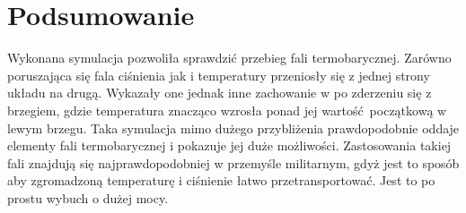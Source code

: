 \documentclass[a4paper, 12pt]{article}
\begin{document}
	\section*{Podsumowanie}
	
	Wykonana symulacja pozwoliła sprawdzić przebieg fali termobarycznej. 
	Zarówno poruszająca się fala ciśnienia jak i temperatury przeniosły się z jednej strony układu na drugą. 
	Wykazały one jednak inne zachowanie w po zderzeniu się z brzegiem, gdzie temperatura znacząco wzrosła ponad jej wartość początkową w lewym brzegu.
	Taka symulacja mimo dużego przybliżenia prawdopodobnie oddaje elementy fali termobarycznej i pokazuje jej duże możliwości.
	Zastosowania takiej fali znajdują się najprawdopodobniej w przemyśle militarnym, gdyż jest to sposób aby zgromadzoną temperaturę i ciśnienie łatwo przetransportować.
	Jest to po prostu wybuch o dużej mocy. 
	
\end{document}
